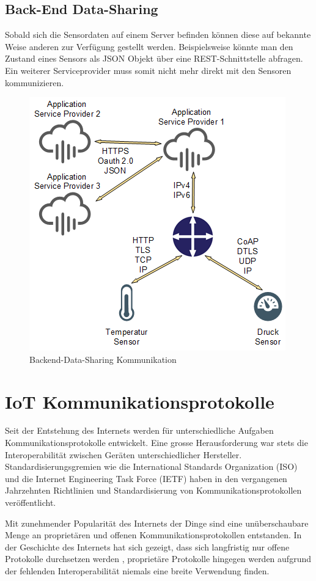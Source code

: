 \subsection{Back-End Data-Sharing}
Sobald sich die Sensordaten auf einem Server befinden können diese auf bekannte Weise anderen zur Verfügung gestellt werden. Beispielsweise könnte man den Zustand eines Sensors als JSON Objekt über eine REST-Schnittstelle abfragen. Ein weiterer Serviceprovider muss somit nicht mehr direkt mit den Sensoren kommunizieren.
\begin{figure}[H]
\centering
\includegraphics[scale=0.8]{images/backend-data-sharing.png}
\caption{Backend-Data-Sharing Kommunikation}
\end{figure}

\section{IoT Kommunikationsprotokolle}
Seit der Entstehung des Internets werden für unterschiedliche Aufgaben Kommunikationsprotokolle entwickelt. Eine grosse Herausforderung war stets die Interoperabilität zwischen Geräten unterschiedlicher Hersteller. Standardisierungsgremien wie die International Standards Organization (ISO) und die Internet Engineering Task Force (IETF) haben in den vergangenen Jahrzehnten Richtlinien und Standardisierung von Kommunikationsprotokollen veröffentlicht. 

Mit zunehmender Popularität des Internets der Dinge sind eine unüberschaubare Menge an proprietären und offenen Kommunikationsprotokollen entstanden. In der Geschichte des Internets hat sich gezeigt, dass sich langfristig nur offene Protokolle durchsetzen werden \cite{Obermaier14}, proprietäre Protokolle hingegen werden aufgrund der fehlenden Interoperabilität niemals eine breite Verwendung finden.
